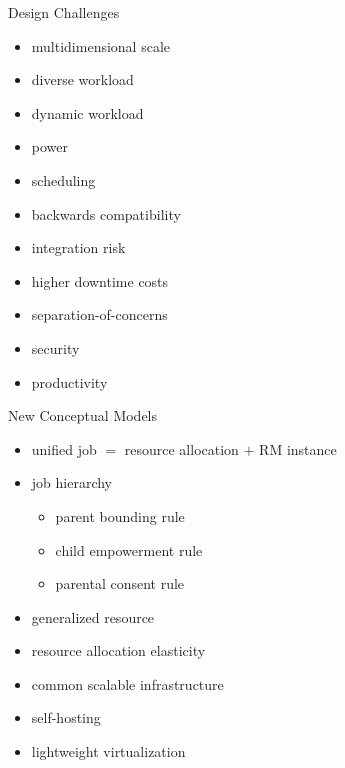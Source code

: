 \documentclass[default,pdf,colorBG,slideColor]{prosper}
\begin{document}
\begin{slide}{Design Challenges}{\small
\begin{minipage}{0.47\textwidth}
\begin{itemize}
  \item{multidimensional scale}
  \item{diverse workload}
  \item{dynamic workload}
  \item{power}
  \item{scheduling}
\end{itemize}
\end{minipage}
\begin{minipage}{0.47\textwidth}
\begin{itemize}
  \item{backwards compatibility}
  \item{integration risk}
  \item{higher downtime costs}
  \item{separation-of-concerns}
  \item{security}
  \item{productivity}
\end{itemize}
\end{minipage}
}\end{slide}
\begin{slide}{New Conceptual Models}{\small
\begin{itemize}
  \item{unified job $=$ resource allocation $+$ RM instance}
  \item{job hierarchy}
  \begin{itemize}
    \item{parent bounding rule}
    \item{child empowerment rule}
    \item{parental consent rule}
  \end{itemize}
  \item{generalized resource}
  \item{resource allocation elasticity}
  \item{common scalable infrastructure}
  \item{self-hosting}
  \item{lightweight virtualization}
\end{itemize}
}\end{slide}
\end{document}
